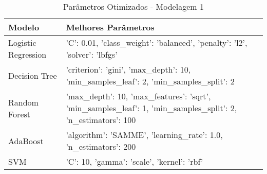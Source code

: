 \begin{table}[H] %
    \centering
    \caption{Parâmetros Otimizados - Modelagem 1}
    \label{tab:melhores_parametros_modelagem_1}
    \renewcommand{\arraystretch}{1.25} %
    \begin{adjustwidth}{ -1in }{ -1in } %
    \centering %
    \small %
    \begin{tabular}{ll}
\toprule
             Modelo &                                                                                           Melhores Parâmetros \\
\midrule
Logistic Regression &                                   {'C': 0.01, 'class_weight': 'balanced', 'penalty': 'l2', 'solver': 'lbfgs'} \\
      Decision Tree &                         {'criterion': 'gini', 'max_depth': 10, 'min_samples_leaf': 2, 'min_samples_split': 2} \\
      Random Forest & {'max_depth': 10, 'max_features': 'sqrt', 'min_samples_leaf': 1, 'min_samples_split': 2, 'n_estimators': 100} \\
           AdaBoost &                                             {'algorithm': 'SAMME', 'learning_rate': 1.0, 'n_estimators': 200} \\
                SVM &                                                                  {'C': 10, 'gamma': 'scale', 'kernel': 'rbf'} \\
\bottomrule
\end{tabular}
    \end{adjustwidth}
    \renewcommand{\arraystretch}{1.0} %
\end{table}
